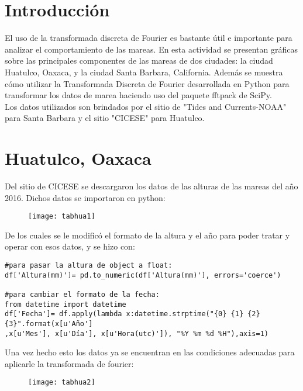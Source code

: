 \documentclass[12pt]{article}
\begin{document}
\section*{Introducción}
El uso de la transformada discreta de Fourier es bastante útil e importante para analizar el comportamiento de las mareas.
En esta actividad se presentan gráficas sobre las principales componentes de las mareas de dos ciudades: la ciudad Huatulco, Oaxaca, y  la ciudad Santa Barbara, California. Además se muestra cómo utilizar la Transformada Discreta de Fourier desarrollada en Python para transformar los datos de marea haciendo uso del paquete fftpack de SciPy. \\
Los datos utilizados son brindados por el sitio de "Tides and Currents-NOAA" para Santa Barbara y el sitio "CICESE" para Huatulco.







\newpage 

\section*{Huatulco, Oaxaca}
Del sitio de CICESE se descargaron los datos de las alturas de las mareas del año 2016. Dichos datos se importaron en python: 

\begin{figure}[ht]
\texttt{[image: tabhua1]}
\centering
\end{figure}


De los cuales se le modificó  el formato de la altura y el año para poder tratar y operar con esos datos, y se hizo con:


\begin{verbatim}
#para pasar la altura de object a float:
df['Altura(mm)']= pd.to_numeric(df['Altura(mm)'], errors='coerce') 

#para cambiar el formato de la fecha:
from datetime import datetime
df['Fecha']= df.apply(lambda x:datetime.strptime("{0} {1} {2} {3}".format(x[u'Año']
,x[u'Mes'], x[u'Día'], x[u'Hora(utc)']), "%Y %m %d %H"),axis=1)

\end{verbatim}

Una vez hecho esto los datos ya se encuentran en las condiciones adecuadas para aplicarle la transformada de fourier:

\begin{figure}[ht]
\texttt{[image: tabhua2]}
\centering
\end{figure}
\end{document}
